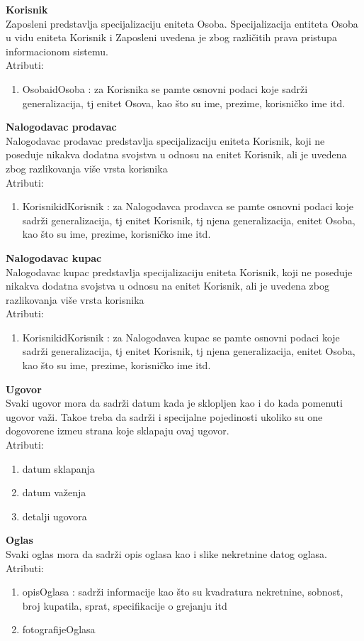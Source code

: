 \documentclass[20pt]{article}
\begin{document}
{\bfseries Korisnik}\\
Zaposleni predstavlja specijalizaciju eniteta Osoba. Specijalizacija entiteta Osoba u vidu eniteta Korisnik i Zaposleni uvedena je zbog razli\v {c}itih prava pristupa informacionom sistemu.\\
\indent Atributi:
\begin{enumerate}
        \item  OsobaidOsoba : za Korisnika se pamte osnovni podaci koje sadr\v {z}i generalizacija, tj enitet Osova, kao \v {s}to su ime, prezime, korisni\v {c}ko ime itd.
\end{enumerate}
{\bfseries Nalogodavac prodavac}\\
Nalogodavac prodavac predstavlja specijalizaciju eniteta Korisnik, koji ne poseduje nikakva dodatna svojstva u odnosu na enitet Korisnik, ali je uvedena zbog razlikovanja vi\v {s}e vrsta korisnika\\
\indent Atributi:
\begin{enumerate}
        \item  KorisnikidKorisnik : za Nalogodavca prodavca se pamte osnovni podaci koje sadr\v {z}i generalizacija, tj enitet Korisnik, tj njena generalizacija, enitet Osoba, kao \v {s}to su ime, prezime, korisni\v {c}ko ime itd.
\end{enumerate}
{\bfseries Nalogodavac kupac}\\
Nalogodavac kupac predstavlja specijalizaciju eniteta Korisnik, koji ne poseduje nikakva dodatna svojstva u odnosu na enitet Korisnik, ali je uvedena zbog razlikovanja vi\v {s}e vrsta korisnika\\
\indent Atributi:
\begin{enumerate}
        \item  KorisnikidKorisnik : za Nalogodavca kupac se pamte osnovni podaci koje sadr\v {z}i generalizacija, tj enitet Korisnik, tj njena generalizacija, enitet Osoba, kao \v {s}to su ime, prezime, korisni\v {c}ko ime itd.
\end{enumerate}
{\bfseries Ugovor}\\
Svaki ugovor mora da sadr\v {z}i datum kada je sklopljen kao i do kada pomenuti ugovor va\v {z}i. Tako\dj e treba da sadr\v {z}i i specijalne pojedinosti ukoliko su one dogovorene izme\dj u strana koje sklapaju ovaj ugovor.\\
\indent Atributi:
\begin{enumerate}
        \item  datum sklapanja
        \item  datum va\v {z}enja
        \item  detalji ugovora
\end{enumerate}
\newpage
{\bfseries Oglas}\\
Svaki oglas mora da sadr\v {z}i opis oglasa kao i slike nekretnine datog oglasa.\\
\indent Atributi:
\begin{enumerate}
        \item  opisOglasa : sadr\v {z}i informacije kao \v {s}to su kvadratura nekretnine, sobnost, broj kupatila, sprat, specifikacije o grejanju itd
        \item  fotografijeOglasa
\end{enumerate}
\end{document}
